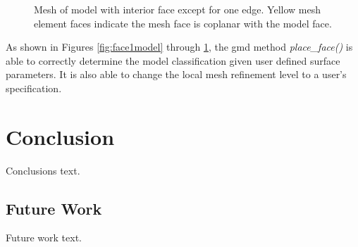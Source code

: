 \documentclass[a4paper, 12pt]{article}
\begin{document}
\begin{figure}[H]
  \centering
  \caption{Mesh of model with interior face except for one edge. 
        Yellow mesh element faces indicate the mesh face is coplanar with the
        model face.}
  \label{fig:face3mesh}
\end{figure}

As shown in Figures \ref{fig:face1model} through \ref{fig:face3mesh}, 
the gmd method \emph{place\_face()} is able to correctly determine 
the model classification given user defined surface parameters. It is also 
able to change the local mesh refinement level to a user's specification. 

\section{Conclusion} \label{sec:conclusion}
Conclusions text. 

\subsection{Future Work} \label{subsec:future}
Future work text.
\end{document}
